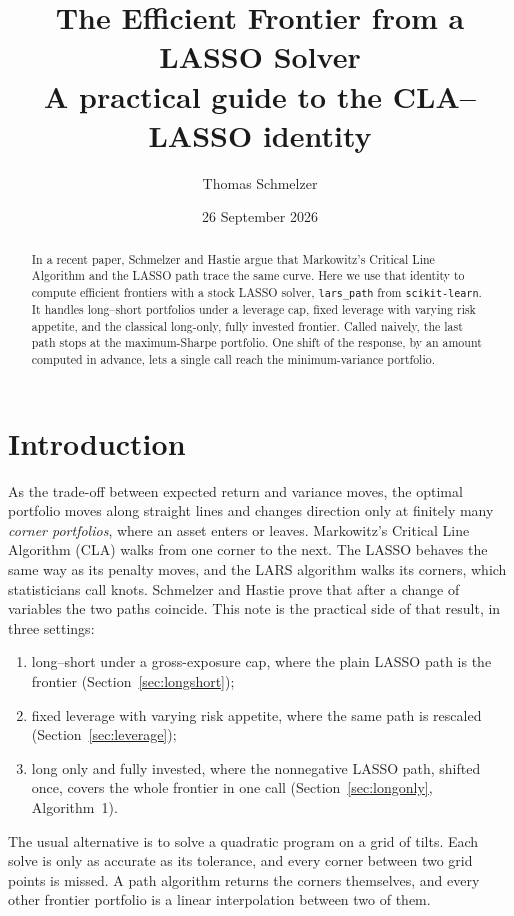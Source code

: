 \documentclass[11pt]{article}
\title{The Efficient Frontier from a LASSO Solver\\[6pt]
{\normalsize A practical guide to the CLA--LASSO identity}}
\author{Thomas Schmelzer}
\date{26 September 2026}
\begin{document}
\maketitle

\begin{abstract}
In a recent paper, Schmelzer and Hastie argue that Markowitz's Critical Line Algorithm
and the LASSO path trace the same curve. Here we use that identity to compute efficient
frontiers with a stock LASSO solver, \texttt{lars\_path} from \texttt{scikit-learn}. It
handles long--short portfolios under a leverage cap, fixed leverage with varying risk
appetite, and the classical long-only, fully invested frontier. Called naively, the last
path stops at the maximum-Sharpe portfolio. One shift of the response, by an amount
computed in advance, lets a single call reach the minimum-variance portfolio.
\end{abstract}

\section{Introduction}

As the trade-off between expected return and variance moves, the optimal portfolio moves
along straight lines and changes direction only at finitely many \emph{corner
portfolios}, where an asset enters or leaves. Markowitz's Critical Line Algorithm (CLA)
\cite{markowitz1956} walks from one corner to the next. The LASSO \cite{tibshirani1996}
behaves the same way as its penalty moves, and the LARS algorithm \cite{efron2004} walks
its corners, which statisticians call knots. Schmelzer and Hastie \cite{perspective}
prove that after a change of variables the two paths coincide. This note is the
practical side of that result, in three settings:
\begin{enumerate}\setlength{\itemsep}{0pt}
\item long--short under a gross-exposure cap, where the plain LASSO path is the frontier
(Section~\ref{sec:longshort});
\item fixed leverage with varying risk appetite, where the same path is rescaled
(Section~\ref{sec:leverage});
\item long only and fully invested, where the nonnegative LASSO path, shifted once,
covers the whole frontier in one call (Section~\ref{sec:longonly}, Algorithm~1).
\end{enumerate}
The usual alternative is to solve a quadratic program on a grid of tilts. Each solve is
only as accurate as its tolerance, and every corner between two grid points is missed.
A path algorithm returns the corners themselves, and every other frontier portfolio is a
linear interpolation between two of them.
\end{document}
